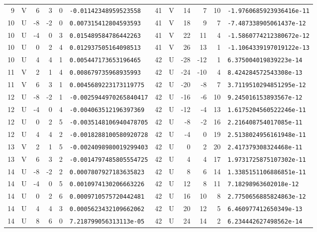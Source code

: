 \begin{longtable}{rcrrrl|rcrrrl}
9 & V & 6 & 3 & 0 & \texttt{-0.01142348959523558} & 41 & V & 14 & 7 & 10 & \texttt{-1.9760685923936416e-11}\\
10 & U & -8 & -2 & 0 & \texttt{0.007315412804593593} & 41 & V & 18 & 9 & 7 & \texttt{-7.487338905061437e-12}\\
10 & U & -4 & 0 & 3 & \texttt{0.015489584786442263} & 41 & V & 22 & 11 & 4 & \texttt{-1.5860774212380672e-12}\\
10 & U & 0 & 2 & 4 & \texttt{0.012937505164098513} & 41 & V & 26 & 13 & 1 & \texttt{-1.1064339197019122e-13}\\
10 & U & 4 & 4 & 1 & \texttt{0.005447173653196465} & 42 & U & -28 & -12 & 1 & \texttt{6.375004019839223e-14}\\
11 & V & 2 & 1 & 4 & \texttt{0.008679735968935993} & 42 & U & -24 & -10 & 4 & \texttt{8.424284572543308e-13}\\
11 & V & 6 & 3 & 1 & \texttt{0.0045689223173119775} & 42 & U & -20 & -8 & 7 & \texttt{3.7119510294851295e-12}\\
12 & U & -8 & -2 & 1 & \texttt{-0.0025944970265840417} & 42 & U & -16 & -6 & 10 & \texttt{9.245016153893567e-12}\\
12 & U & -4 & 0 & 4 & \texttt{-0.004063512196397369} & 42 & U & -12 & -4 & 13 & \texttt{1.6175204560522246e-11}\\
12 & U & 0 & 2 & 5 & \texttt{-0.0035148106940478705} & 42 & U & -8 & -2 & 16 & \texttt{2.216408754017085e-11}\\
12 & U & 4 & 4 & 2 & \texttt{-0.0018288100580920728} & 42 & U & -4 & 0 & 19 & \texttt{2.5138024956161948e-11}\\
13 & V & 2 & 1 & 5 & \texttt{-0.0024098980019299403} & 42 & U & 0 & 2 & 20 & \texttt{2.417379308324468e-11}\\
13 & V & 6 & 3 & 2 & \texttt{-0.0014797485805554725} & 42 & U & 4 & 4 & 17 & \texttt{1.9731725875107302e-11}\\
14 & U & -8 & -2 & 2 & \texttt{0.0007807927183635823} & 42 & U & 8 & 6 & 14 & \texttt{1.3385151106886851e-11}\\
14 & U & -4 & 0 & 5 & \texttt{0.0010974130206663226} & 42 & U & 12 & 8 & 11 & \texttt{7.18298963602018e-12}\\
14 & U & 0 & 2 & 6 & \texttt{0.0009710575720442481} & 42 & U & 16 & 10 & 8 & \texttt{2.7750656885824863e-12}\\
14 & U & 4 & 4 & 3 & \texttt{0.0005623432109662062} & 42 & U & 20 & 12 & 5 & \texttt{6.460977412650349e-13}\\
14 & U & 8 & 6 & 0 & \texttt{7.218799056313113e-05} & 42 & U & 24 & 14 & 2 & \texttt{6.234442627498562e-14}\\

\end{longtable}
